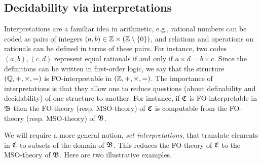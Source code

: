 

\subsection{Decidability via interpretations}
Interpretations are a familiar idea in arithmetic, e.g., rational numbers can be coded as pairs of integers $(a,b) \in \mathbb{Z} \times (\mathbb{Z} \setminus \{0\})$, and relations and operations on rationals can be defined in terms of these pairs. For instance, two codes $(a,b), (c,d)$ represent equal rationals if and only if $a\times d = b \times c$. Since the definitions can be written in first-order logic, we say that the structure $(\mathbb{Q},+,\times,=)$ is FO-interpretable in $(\mathbb{Z},+,\times,=)$. 
The importance of interpretations is that they allow one to reduce questions (about definability and decidability) of one structure to another. For instance, if $\mathfrak{C}$ is FO-interpretable in $\mathfrak{B}$ then the FO-theory (resp. MSO-theory) of $\mathfrak{C}$ is computable from the FO-theory (resp. MSO-theory) of $\mathfrak{B}$. 

We will require a more general notion, \emph{set interpretations}, that translate elements in $\mathfrak{C}$ to subsets of the domain of $\mathfrak{B}$. This reduces the FO-theory of $\mathfrak{C}$ to the MSO-theory of $\mathfrak{B}$. Here are two illustrative examples.


